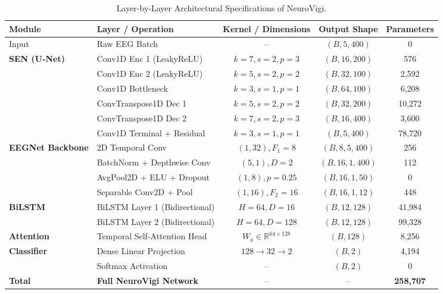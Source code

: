\documentclass[conference]{IEEEtran}
\begin{document}
\begin{table}[t]
\caption{Layer-by-Layer Architectural Specifications of NeuroVigi.}
\label{tab:layer_spec}
\centering
\footnotesize
\setlength{\tabcolsep}{8pt}
\begin{tabular}{@{}llccc@{}}
\toprule
\textbf{Module} & \textbf{Layer / Operation} & \textbf{Kernel / Dimensions} & \textbf{Output Shape} & \textbf{Parameters} \\
\midrule
Input & Raw EEG Batch & -- & $(B, 5, 400)$ & 0 \\
\midrule
\multirow{6}{*}{\textbf{SEN (U-Net)}}
 & Conv1D Enc 1 (LeakyReLU) & $k=7, s=2, p=3$ & $(B, 16, 200)$ & 576 \\
 & Conv1D Enc 2 (LeakyReLU) & $k=5, s=2, p=2$ & $(B, 32, 100)$ & 2,592 \\
 & Conv1D Bottleneck & $k=3, s=1, p=1$ & $(B, 64, 100)$ & 6,208 \\
 & ConvTranspose1D Dec 1 & $k=5, s=2, p=2$ & $(B, 32, 200)$ & 10,272 \\
 & ConvTranspose1D Dec 2 & $k=7, s=2, p=3$ & $(B, 16, 400)$ & 3,600 \\
 & Conv1D Terminal + Residual & $k=3, s=1, p=1$ & $(B, 5, 400)$ & 78,720 \\
\midrule
\multirow{4}{*}{\textbf{EEGNet Backbone}}
 & 2D Temporal Conv & $(1, 32), F_1=8$ & $(B, 8, 5, 400)$ & 256 \\
 & BatchNorm + Depthwise Conv & $(5, 1), D=2$ & $(B, 16, 1, 400)$ & 112 \\
 & AvgPool2D + ELU + Dropout & $(1, 8), p=0.25$ & $(B, 16, 1, 50)$ & 0 \\
 & Separable Conv2D + Pool & $(1, 16), F_2=16$ & $(B, 16, 1, 12)$ & 448 \\
\midrule
\multirow{2}{*}{\textbf{BiLSTM}}
 & BiLSTM Layer 1 (Bidirectional) & $H=64, D=16$ & $(B, 12, 128)$ & 41,984 \\
 & BiLSTM Layer 2 (Bidirectional) & $H=64, D=128$ & $(B, 12, 128)$ & 99,328 \\
\midrule
\textbf{Attention}
 & Temporal Self-Attention Head & $W_a \in \mathbb{R}^{64 \times 128}$ & $(B, 128)$ & 8,256 \\
\midrule
\multirow{2}{*}{\textbf{Classifier}}
 & Dense Linear Projection & $128 \to 32 \to 2$ & $(B, 2)$ & 4,194 \\
 & Softmax Activation & -- & $(B, 2)$ & 0 \\
\midrule
\textbf{Total} & \textbf{Full NeuroVigi Network} & -- & -- & \textbf{258,707} \\
\bottomrule
\end{tabular}
\end{table}
\end{document}
